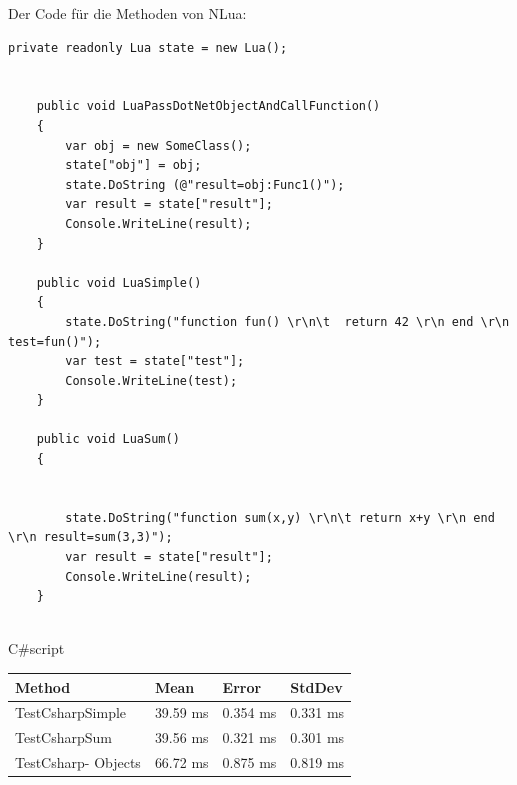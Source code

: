 \newpage
 Der Code für die Methoden von NLua:
\begin{lstlisting}[language={[Sharp]C}, caption=NluaTestMethods, label=lst:imp:nluam]
    private readonly Lua state = new Lua();

    
    public void LuaPassDotNetObjectAndCallFunction()
    {
        var obj = new SomeClass();
        state["obj"] = obj;
        state.DoString (@"result=obj:Func1()");
        var result = state["result"];
        Console.WriteLine(result);
    }

    public void LuaSimple()
    {
        state.DoString("function fun() \r\n\t  return 42 \r\n end \r\n test=fun()");
        var test = state["test"];
        Console.WriteLine(test);
    }

    public void LuaSum()
    {


        state.DoString("function sum(x,y) \r\n\t return x+y \r\n end \r\n result=sum(3,3)");
        var result = state["result"];
        Console.WriteLine(result);
    }
    
\end{lstlisting}

\newpage
C\#script
        \begin{table}[H]
            \begin{tabular}{|p{3.5cm}|p{3cm}|p{3cm}|p{3cm}|}
            \hline
                Method & Mean & Error & StdDev \\ \hline
                TestCsharpSimple & 39.59 ms & 0.354 ms & 0.331 ms \\ \hline
                TestCsharpSum & 39.56 ms & 0.321 ms & 0.301 ms \\ \hline
                TestCsharp-
                Objects & 66.72 ms & 0.875 ms & 0.819 ms \\ \hline
            \end{tabular}
        \end{table}


